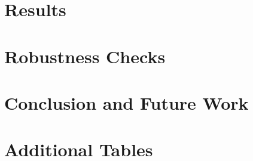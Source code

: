 \documentclass[12pt]{article}
\begin{document}




















\section{Results}
\section{Robustness Checks}
\section{Conclusion and Future Work}






\newpage




\newpage

\appendix

\section{Additional Tables}
\end{document}
